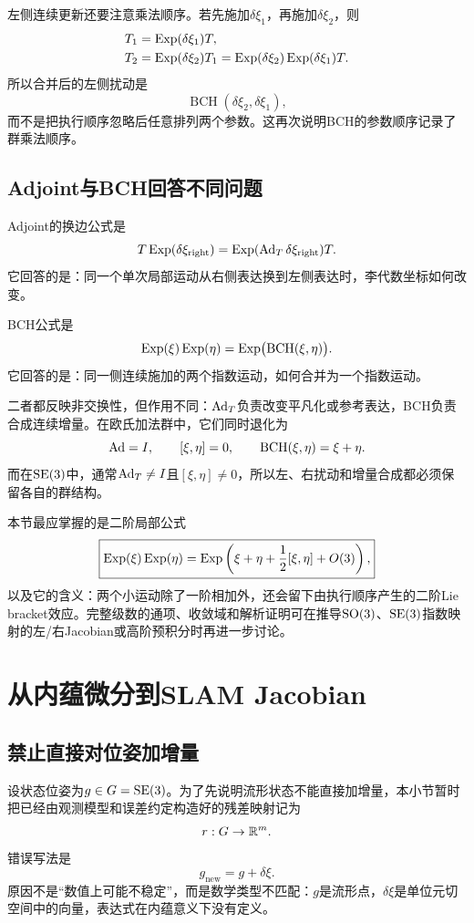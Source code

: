 左侧连续更新还要注意乘法顺序。若先施加$\delta\xi_1$，再施加$\delta\xi_2$，则
\[
\begin{aligned}
    T_1&=\operatorname{Exp}(\delta\xi_1)T,\\
    T_2&=\operatorname{Exp}(\delta\xi_2)T_1
    =\operatorname{Exp}(\delta\xi_2)\operatorname{Exp}(\delta\xi_1)T.
\end{aligned}
\]
所以合并后的左侧扰动是
\[
    \operatorname{BCH}(\delta\xi_2,\delta\xi_1),
\]
而不是把执行顺序忽略后任意排列两个参数。这再次说明BCH的参数顺序记录了群乘法顺序。

\subsection{Adjoint与BCH回答不同问题}

Adjoint的换边公式是
\[
    T\operatorname{Exp}(\delta\xi_{\mathrm{right}})
    =\operatorname{Exp}(\operatorname{Ad}_T\delta\xi_{\mathrm{right}})T.
\]
它回答的是：同一个单次局部运动从右侧表达换到左侧表达时，李代数坐标如何改变。

BCH公式是
\[
    \operatorname{Exp}(\xi)\operatorname{Exp}(\eta)
    =\operatorname{Exp}\bigl(\operatorname{BCH}(\xi,\eta)\bigr).
\]
它回答的是：同一侧连续施加的两个指数运动，如何合并为一个指数运动。

二者都反映非交换性，但作用不同：$\operatorname{Ad}_T$负责改变平凡化或参考表达，BCH负责合成连续增量。在欧氏加法群中，它们同时退化为
\[
    \operatorname{Ad}=I,
    \qquad
    [\xi,\eta]=0,
    \qquad
    \operatorname{BCH}(\xi,\eta)=\xi+\eta.
\]
而在$\operatorname{SE}(3)$中，通常$\operatorname{Ad}_T\neq I$且$[\xi,\eta]\neq0$，所以左、右扰动和增量合成都必须保留各自的群结构。

本节最应掌握的是二阶局部公式
\[
    \boxed{
    \operatorname{Exp}(\xi)\operatorname{Exp}(\eta)
    =\operatorname{Exp}\left(
        \xi+\eta+\frac12[\xi,\eta]+O(3)
    \right),
    }
\]
以及它的含义：两个小运动除了一阶相加外，还会留下由执行顺序产生的二阶Lie bracket效应。完整级数的通项、收敛域和解析证明可在推导$\operatorname{SO}(3)$、$\operatorname{SE}(3)$指数映射的左/右Jacobian或高阶预积分时再进一步讨论。


\section{从内蕴微分到SLAM Jacobian}

\subsection{禁止直接对位姿加增量}

设状态位姿为$g\in G=\operatorname{SE}(3)$。为了先说明流形状态不能直接加增量，本小节暂时把已经由观测模型和误差约定构造好的残差映射记为
\[
    r:G\to\mathbb{R}^m.
\]
错误写法是
\[
    g_{\mathrm{new}}=g+\delta\xi.
\]
原因不是“数值上可能不稳定”，而是数学类型不匹配：$g$是流形点，$\delta\xi$是单位元切空间中的向量，表达式在内蕴意义下没有定义。

